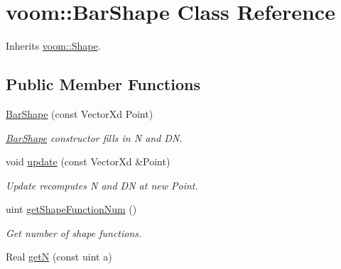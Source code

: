 \hypertarget{classvoom_1_1_bar_shape}{
\section{voom::BarShape Class Reference}
\label{classvoom_1_1_bar_shape}
}


Inherits \hyperlink{classvoom_1_1_shape}{voom::Shape}.\subsection*{Public Member Functions}
\begin{DoxyCompactItemize}
\item 
\hypertarget{classvoom_1_1_bar_shape_aecbbeda76178a50e57157c19c2cc3b12}{
\hyperlink{classvoom_1_1_bar_shape_aecbbeda76178a50e57157c19c2cc3b12}{BarShape} (const VectorXd Point)}
\label{classvoom_1_1_bar_shape_aecbbeda76178a50e57157c19c2cc3b12}

\begin{DoxyCompactList}\small\item\em \hyperlink{classvoom_1_1_bar_shape}{BarShape} constructor fills in N and DN. \item\end{DoxyCompactList}\item 
\hypertarget{classvoom_1_1_bar_shape_a96553f21360eec6a645410134059ec25}{
void \hyperlink{classvoom_1_1_bar_shape_a96553f21360eec6a645410134059ec25}{update} (const VectorXd \&Point)}
\label{classvoom_1_1_bar_shape_a96553f21360eec6a645410134059ec25}

\begin{DoxyCompactList}\small\item\em Update recomputes N and DN at new Point. \item\end{DoxyCompactList}\item 
\hypertarget{classvoom_1_1_bar_shape_aadbe11783d23b60d60d120c7a32a8b0b}{
uint \hyperlink{classvoom_1_1_bar_shape_aadbe11783d23b60d60d120c7a32a8b0b}{getShapeFunctionNum} ()}
\label{classvoom_1_1_bar_shape_aadbe11783d23b60d60d120c7a32a8b0b}

\begin{DoxyCompactList}\small\item\em Get number of shape functions. \item\end{DoxyCompactList}\item 
\hypertarget{classvoom_1_1_bar_shape_a2931b43bf8ba05a5c2beb8b29012789c}{
Real \hyperlink{classvoom_1_1_bar_shape_a2931b43bf8ba05a5c2beb8b29012789c}{getN} (const uint a)}
\label{classvoom_1_1_bar_shape_a2931b43bf8ba05a5c2beb8b29012789c}


\end{DoxyCompactItemize}
